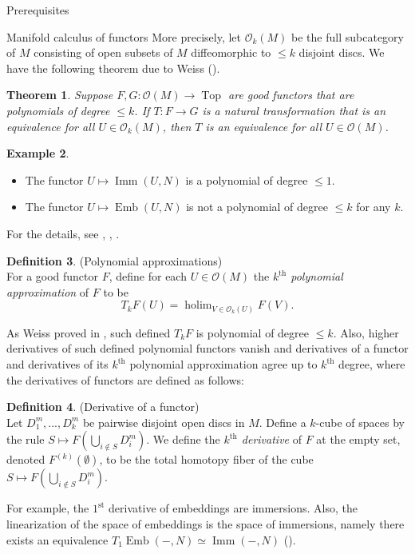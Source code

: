 \documentclass[12pt]{amsart}
\newcommand{\holim}{\operatorname{holim}}
\newcommand{\Emb}{\operatorname{Emb}}
\newcommand{\Imm}{\operatorname{Imm}}
\newcommand{\Top}{\operatorname{Top}}
\theoremstyle{plain}
\newtheorem{thm}{Theorem}[section]
\theoremstyle{definition}
\newtheorem{defin}[thm]{Definition}
\newtheorem{example}[thm]{Example}
\theoremstyle{remark}
\begin{document}
\begin{section}{Prerequisites}
\begin{subsection}{Manifold calculus of functors}
More precisely, let $\mathcal{O}_k(M)$ be the full subcategory of $M$ consisting of open subsets of $M$ diffeomorphic to $\leq k$ disjoint discs. We have the following theorem due to Weiss (\cite[Theorem 5.1]{W:EI1}).
\begin{thm}\label{T:OkO}
Suppose $F,G: \mathcal{O}(M) \longrightarrow \Top$ are good functors that are polynomials of degree $\leq k$. If $T:F \to G$ is a natural transformation that is an equivalence for all $U \in \mathcal{O}_k(M)$, then $T$ is an equivalence for all $U \in \mathcal{O}(M)$.
\end{thm}
\begin{example}\label{E:PolynomialFunctors}\hspace{12cm}
\begin{itemize}
\item{The functor $U \mapsto \Imm(U,N)$ is a polynomial of degree $\leq 1$.}
\item{The functor $U \mapsto \Emb(U,N)$ is not a polynomial of degree $\leq k$ for any $k$.}
\end{itemize}
For the details, see \cite[Example 10.2.10]{MV:Cubes}, \cite[Example 2.3]{W:EI1}, \cite[Examples 4.7 and 4.8]{M:MfldCalc}.
\end{example}
\begin{defin}(Polynomial approximations)\\
For a good functor $F$, define for each $U \in \mathcal{O}(M)$ the \textit{$k^{\text{th}}$ polynomial approximation} of $F$ to be $$T_kF(U)=\holim_{V\in \mathcal{O}_k(U)}F(V).$$
\end{defin}
As Weiss proved in \cite[Theorems 3.9. and 6.1]{W:EI1}, such defined $T_kF$ is polynomial of degree $\leq k$. Also, higher derivatives of such defined polynomial functors vanish and derivatives of a functor and derivatives of its $k^{\text{th}}$ polynomial approximation agree up to $k^{\text{th}}$ degree, where the derivatives of functors are defined as follows:
\begin{defin}\label{D:Derivative}(Derivative of a functor)\\
Let $D_{1}^m, ..., D_{k}^m$ be pairwise disjoint open discs in $M$. Define a $k$-cube of spaces by the rule $S \mapsto F(\bigcup_{i \notin S}
D_{i}^m)$. We define the \textit{$k^{\text{th}}$ derivative} of $F$ at the empty set, denoted $F^{(k)}(\emptyset)$, to be the total homotopy fiber of the cube $S \mapsto F(\bigcup_{i \notin S}D_{i}^m)$.
\end{defin}
For example, the $1^{\text{st}}$ derivative of embeddings are immersions. Also, the linearization of the space of embeddings is the space of immersions, namely there exists an equivalence $T_1 \Emb(-,N) \simeq \Imm(-,N)$ (\cite{W:EI1}).


\end{subsection}
\end{section}
\end{document}
